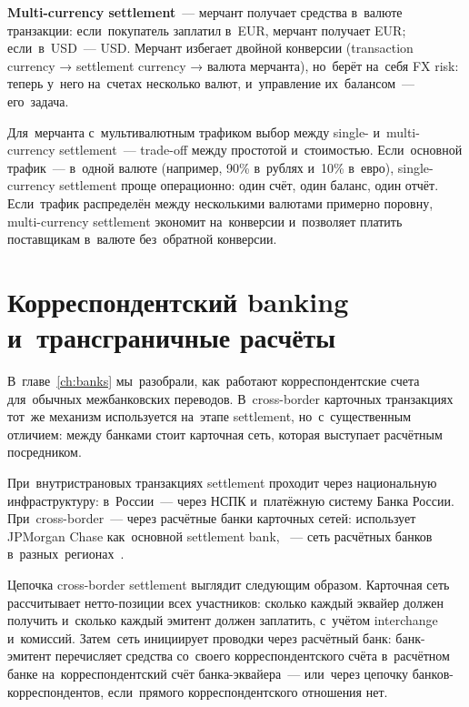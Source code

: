 \textbf{Multi-currency settlement}~--- мерчант получает средства
в~валюте транзакции: если~покупатель заплатил в~EUR, мерчант
получает EUR; если~в~USD~--- USD. Мерчант избегает двойной
конверсии (transaction currency → settlement currency →
валюта мерчанта), но~берёт на~себя FX risk: теперь у~него
на~счетах несколько валют, и~управление их~балансом~---
его~задача.

\begin{practice}
  Для~мерчанта с~мультивалютным трафиком выбор между single-
  и~multi-currency settlement~--- trade-off между простотой
  и~стоимостью. Если~основной трафик~--- в~одной валюте
  (например, 90\% в~рублях и~10\% в~евро), single-currency
  settlement проще операционно: один счёт, один баланс,
  один отчёт. Если~трафик распределён между несколькими
  валютами примерно поровну, multi-currency settlement
  экономит на~конверсии и~позволяет платить поставщикам
  в~валюте без~обратной конверсии.
\end{practice}


\section{Корреспондентский banking и~трансграничные расчёты}
\label{sec:mc-correspondent}

В~главе~\ref{ch:banks} мы~разобрали, как~работают
корреспондентские счета для~обычных межбанковских переводов.
В~cross-border карточных транзакциях тот~же механизм
используется на~этапе settlement, но~с~существенным отличием:
между банками стоит карточная сеть, которая выступает
расчётным посредником.

При~внутристрановых транзакциях settlement проходит через
национальную инфраструктуру: в~России~--- через НСПК
и~платёжную систему Банка России. При~cross-border~---
через расчётные банки карточных сетей: 
использует JPMorgan Chase как~основной settlement bank,
~--- сеть расчётных банков
в~разных~регионах~.

Цепочка cross-border settlement выглядит следующим образом.
Карточная сеть рассчитывает нетто-позиции всех участников:
сколько каждый эквайер должен получить и~сколько каждый
эмитент должен заплатить, с~учётом interchange и~комиссий.
Затем~сеть инициирует проводки через расчётный банк:
банк-эмитент перечисляет средства со~своего корреспондентского
счёта в~расчётном банке на~корреспондентский счёт
банка-эквайера~--- или~через цепочку банков-корреспондентов,
если~прямого корреспондентского отношения нет.

